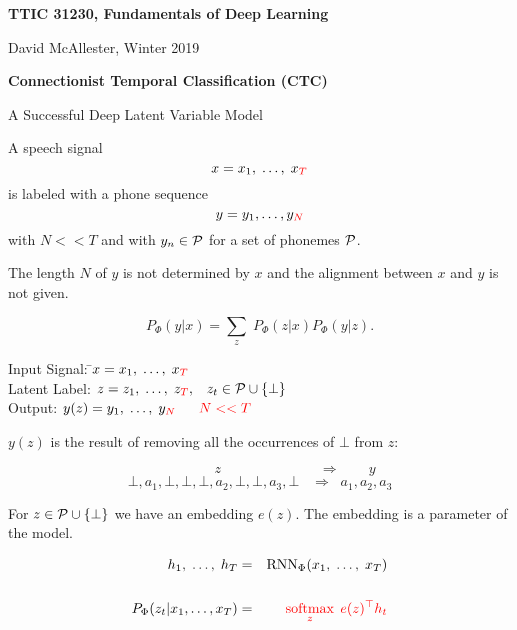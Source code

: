 




{\Huge

  \centerline{\bf TTIC 31230, Fundamentals of Deep Learning}
  \bigskip
  \centerline{David McAllester, Winter 2019}
  \vfill
  \centerline{\bf Connectionist Temporal Classification (CTC)}
\vfill
\vfill
\vfill

{A Successful Deep Latent Variable Model}

A speech signal
$$x = x_1,\; \ldots,\; x_{\color{red} T}$$
is labeled with a phone sequence
$$y = y_1, \ldots, y_{\color{red} N}$$
with {\color{red} $N << T$} and with $y_n \in {\cal P}$ for a set of phonemes ${\cal P}$.

\vfill
{\color{red} The length $N$ of $y$ is not determined by $x$ and the alignment between $x$ and $y$ is not given.}


{\color{red} $$P_\Phi(y|x) = \sum_z\;P_\Phi(z|x)P_\Phi(y|z).$$}

\vfill
\begin{tabbing}
Input Signal: \hspace{3em} \=$x = x_1,\;\ldots,\;x_{\color{red} T}$ \\
Latent Label: \>$z = z_1,\;\ldots,\;z_{\color{red} T},\;\;\;z_t \in {\cal P} \cup \{\bot\}$ \\
Output: \>$y(z) = y_1,\;\ldots,\;y_{\color{red} N}\;\;\;\;\;\;{\color{red} N << T}$
\end{tabbing}

\vfill
$y(z)$ is the result of removing all the occurrences of $\bot$ from $z$:

{\color{red} $$\hspace{5em} z \hspace{7em} \Rightarrow \hspace{2em} y$$}
{\color{red} $$\bot,a_1,\bot,\bot,\bot,a_2,\bot,\bot,a_3,\bot \;\;\;\Rightarrow\;\; a_1,a_2,a_3$$}



For $z \in {\cal P} \cup \{\bot\}$ we have an embedding $e(z)$.  The embedding is a parameter of the model.

\begin{eqnarray*}
  h_1,\;\ldots,\;h_T & = & \mathrm{RNN}_\Phi(x_1,\;\ldots,\;x_T) \\
  \\
  P_\Phi(z_t|x_1,\ldots,x_T) & = & {\color{red} \operatorname*{softmax}_{z} \;e(z)^\top h_t}
\end{eqnarray*}

}
